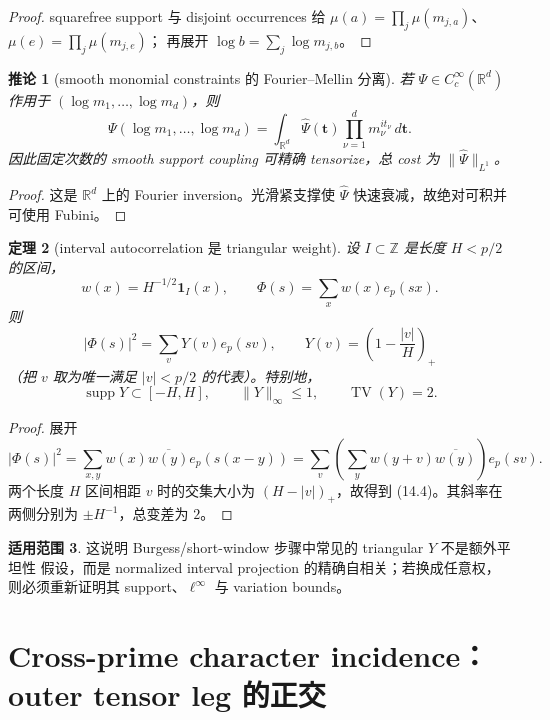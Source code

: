 \documentclass[11pt,a4paper]{ctexart}
\newtheorem{theorem}{定理}[section]
\newtheorem{corollary}[theorem]{推论}
\theoremstyle{definition}
\newtheorem{remark}[theorem]{适用范围}
\newcommand{\ep}{e_p}
\newcommand{\1}{\mathbf 1}
\newcommand{\supp}{\operatorname{supp}}
\begin{document}
\begin{proof}
squarefree support 与 disjoint occurrences 给
$\mu(a)=\prod_j\mu(m_{j,a})$、$\mu(e)=\prod_j\mu(m_{j,e})$；
再展开 $\log b=\sum_j\log m_{j,b}$。
\end{proof}

\begin{corollary}[smooth monomial constraints 的 Fourier--Mellin 分离]
若 $\Psi\in C_c^\infty(\mathbb R^d)$ 作用于
$(\log m_1,\ldots,\log m_d)$，则
\[
\Psi(\log m_1,\ldots,\log m_d)
=\int_{\mathbb R^d}\widehat\Psi(\mathbf t)
\prod_{\nu=1}^dm_\nu^{it_\nu}\,d\mathbf t.
\tag{14.3}
\]
因此固定次数的 smooth support coupling 可精确 tensorize，总 cost 为
$\|\widehat\Psi\|_{L^1}$。
\end{corollary}

\begin{proof}
这是 $\mathbb R^d$ 上的 Fourier inversion。光滑紧支撑使
$\widehat\Psi$ 快速衰减，故绝对可积并可使用 Fubini。
\end{proof}

\begin{theorem}[interval autocorrelation 是 triangular weight]
设 $I\subset\mathbb Z$ 是长度 $H<p/2$ 的区间，
\[
w(x)=H^{-1/2}\mathbf1_I(x),\qquad
\Phi(s)=\sum_xw(x)\ep(sx).
\]
则
\[
|\Phi(s)|^2=\sum_vY(v)\ep(sv),\qquad
Y(v)=\left(1-\frac{|v|}{H}\right)_+
\tag{14.4}
\]
（把 $v$ 取为唯一满足 $|v|<p/2$ 的代表）。特别地，
\[
\supp Y\subset[-H,H],\qquad \|Y\|_\infty\le1,\qquad
\operatorname{TV}(Y)=2.
\tag{14.5}
\]
\end{theorem}

\begin{proof}
展开
\[
|\Phi(s)|^2
=\sum_{x,y}w(x)\overline{w(y)}\ep(s(x-y))
=\sum_v\left(\sum_yw(y+v)\overline{w(y)}\right)\ep(sv).
\]
两个长度 $H$ 区间相距 $v$ 时的交集大小为 $(H-|v|)_+$，故得到
(14.4)。其斜率在两侧分别为 $\pm H^{-1}$，总变差为 $2$。
\end{proof}

\begin{remark}
这说明 Burgess/short-window 步骤中常见的 triangular $Y$ 不是额外平坦性
假设，而是 normalized interval projection 的精确自相关；若换成任意权，
则必须重新证明其 support、$\ell^\infty$ 与 variation bounds。
\end{remark}

\section{Cross-prime character incidence：outer tensor leg 的正交}
\end{document}
